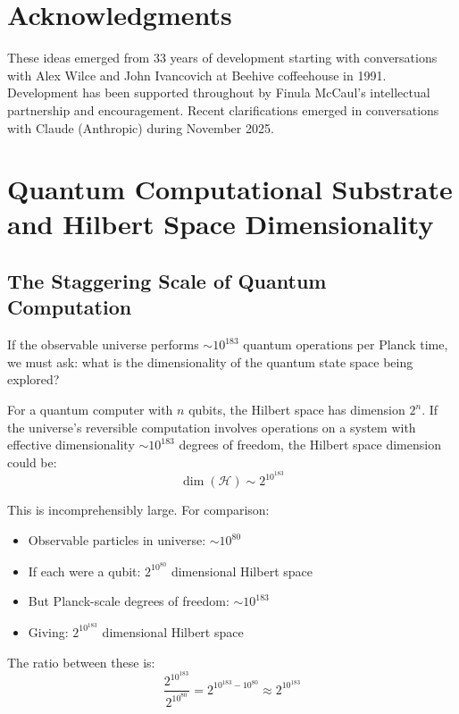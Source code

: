 ﻿\documentclass{article}
\begin{document}
\section{Acknowledgments}


These ideas emerged from 33 years of development starting with conversations with Alex Wilce and John Ivancovich at Beehive coffeehouse in 1991. Development has been supported throughout by Finula McCaul's intellectual partnership and encouragement. Recent clarifications emerged in conversations with Claude (Anthropic) during November 2025.




\section{Quantum Computational Substrate and Hilbert Space Dimensionality}


\subsection{The Staggering Scale of Quantum Computation}


If the observable universe performs $\sim 10^{183}$ quantum operations per Planck time, we must ask: what is the dimensionality of the quantum state space being explored?


For a quantum computer with $n$ qubits, the Hilbert space has dimension $2^n$. If the universe's reversible computation involves operations on a system with effective dimensionality $\sim 10^{183}$ degrees of freedom, the Hilbert space dimension could be:
\begin{equation}
\dim(\mathcal{H}) \sim 2^{10^{183}}
\end{equation}


This is incomprehensibly large. For comparison:
\begin{itemize}
\item Observable particles in universe: $\sim 10^{80}$
\item If each were a qubit: $2^{10^{80}}$ dimensional Hilbert space
\item But Planck-scale degrees of freedom: $\sim 10^{183}$ 
\item Giving: $2^{10^{183}}$ dimensional Hilbert space
\end{itemize}


The ratio between these is:
\begin{equation}
\frac{2^{10^{183}}}{2^{10^{80}}} = 2^{10^{183} - 10^{80}} \approx 2^{10^{183}}
\end{equation}
\end{document}
